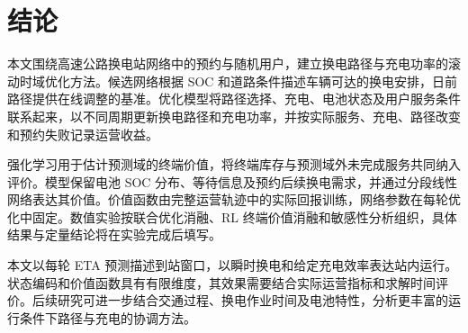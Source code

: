 \section{结论}

本文围绕高速公路换电站网络中的预约与随机用户，建立换电路径与充电功率的滚动时域优化方法。候选网络根据 SOC 和道路条件描述车辆可达的换电安排，日前路径提供在线调整的基准。优化模型将路径选择、充电、电池状态及用户服务条件联系起来，以不同周期更新换电路径和充电功率，并按实际服务、充电、路径改变和预约失败记录运营收益。

强化学习用于估计预测域的终端价值，将终端库存与预测域外未完成服务共同纳入评价。模型保留电池 SOC 分布、等待信息及预约后续换电需求，并通过分段线性网络表达其价值。价值函数由完整运营轨迹中的实际回报训练，网络参数在每轮优化中固定。数值实验按联合优化消融、RL 终端价值消融和敏感性分析组织，具体结果与定量结论将在实验完成后填写。

本文以每轮 ETA 预测描述到站窗口，以瞬时换电和给定充电效率表达站内运行。状态编码和价值函数具有有限维度，其效果需要结合实际运营指标和求解时间评价。后续研究可进一步结合交通过程、换电作业时间及电池特性，分析更丰富的运行条件下路径与充电的协调方法。


